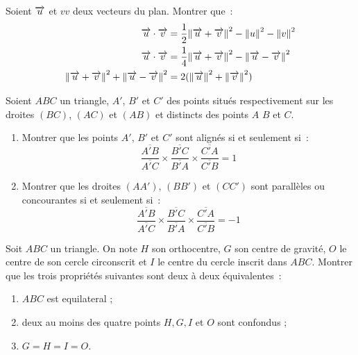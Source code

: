 \begin{exercice}
    Soient \(\overrightarrow{u}\) et \(vv\) deux vecteurs du plan. Montrer que~:
    \begin{align}
        \overrightarrow{u} \cdot \overrightarrow{v} &= \frac{1}{2}{\left\lVert\overrightarrow{u}+\overrightarrow{v}\right\rVert^2 - \left\lVert u\right\rVert^2-\left\lVert v\right\rVert^2} \\
        \overrightarrow{u} \cdot \overrightarrow{v} &= \frac{1}{4}{\left\lVert\overrightarrow{u}+\overrightarrow{v}\right\rVert^2 - \left\lVert\overrightarrow{u}-\overrightarrow{v}\right\rVert^2} \\
        \left\lVert\overrightarrow{u}+\overrightarrow{v}\right\rVert^2 + \left\lVert\overrightarrow{u}-\overrightarrow{v}\right\rVert^2 &= 2(\left\lVert\overrightarrow{u}\right\rVert^2+\left\lVert\overrightarrow{v}\right\rVert^2)
    \end{align}
\end{exercice}
\begin{exercice}
    Soient \(ABC\) un triangle, \(A'\), \(B'\) et \(C'\) des points situés respectivement sur les droites \((BC)\), \((AC)\) et \((AB)\) et distincts des points \(A\) \(B\) et \(C\).
    \begin{enumerate}
        \item Montrer que les points \(A'\), \(B'\) et \(C'\) sont alignés si et seulement si~:
            \begin{equation}
                \frac{\overline{A'B}}{\overline{A'C}} \times \frac{\overline{B'C}}{\overline{B'A}} \times \frac{\overline{C'A}}{\overline{C'B}} = 1
            \end{equation}
        \item Montrer que les droites \((AA')\), \((BB')\) et \((CC')\) sont parallèles ou concourantes si et seulement si~: 
            \begin{equation}
                \frac{\overline{A'B}}{\overline{A'C}} \times \frac{\overline{B'C}}{\overline{B'A}} \times \frac{\overline{C'A}}{\overline{C'B}} = -1
            \end{equation}
    \end{enumerate}
\end{exercice}
\begin{exercice}
    Soit \(ABC\) un triangle. On note \(H\) son orthocentre, \(G\) son centre de gravité, \(O\) le centre de son cercle circonscrit et \(I\) le centre du cercle inscrit dans \(ABC\). Montrer que les trois propriétés suivantes sont deux à deux équivalentes~:
    \begin{enumerate}
        \item \(ABC\) est equilateral ;
        \item deux au moins des quatre points \(H, G, I\) et \(O\) sont confondus ;
        \item \(G = H = I = O\).
    \end{enumerate}
\end{exercice}
